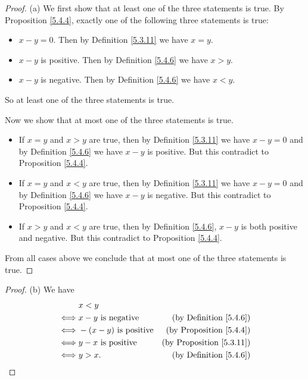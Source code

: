 \begin{proof}{(a)}
    We first show that at least one of the three statements is true.
    By Proposition \ref{5.4.4}, exactly one of the following three statements is true:
    \begin{itemize}
        \item \(x - y = 0\).
              Then by Definition \ref{5.3.11} we have \(x = y\).
        \item \(x - y\) is positive.
              Then by Definition \ref{5.4.6} we have \(x > y\).
        \item \(x - y\) is negative.
              Then by Definition \ref{5.4.6} we have \(x < y\).
    \end{itemize}
    So at least one of the three statements is true.

    Now we show that at most one of the three statements is true.
    \begin{itemize}
        \item If \(x = y\) and \(x > y\) are true, then by Definition \ref{5.3.11} we have \(x - y = 0\) and by Definition \ref{5.4.6} we have \(x - y\) is positive.
              But this contradict to Proposition \ref{5.4.4}.
        \item If \(x = y\) and \(x < y\) are true, then by Definition \ref{5.3.11} we have \(x - y = 0\) and by Definition \ref{5.4.6} we have \(x - y\) is negative.
              But this contradict to Proposition \ref{5.4.4}.
        \item If \(x > y\) and \(x < y\) are true, then by Definition \ref{5.4.6}, \(x - y\) is both positive and negative.
              But this contradict to Proposition \ref{5.4.4}.
    \end{itemize}
    From all cases above we conclude that at most one of the three statements is true.
\end{proof}

\begin{proof}{(b)}
    We have
    \begin{align*}
             & x < y                                                               \\
        \iff & x - y \text{ is negative}    & \text{(by Definition \ref{5.4.6})}   \\
        \iff & -(x - y) \text{ is positive} & \text{(by Proposition \ref{5.4.4})}  \\
        \iff & y - x \text{ is positive}    & \text{(by Proposition \ref{5.3.11})} \\
        \iff & y > x.                       & \text{(by Definition \ref{5.4.6})}
    \end{align*}
\end{proof}

